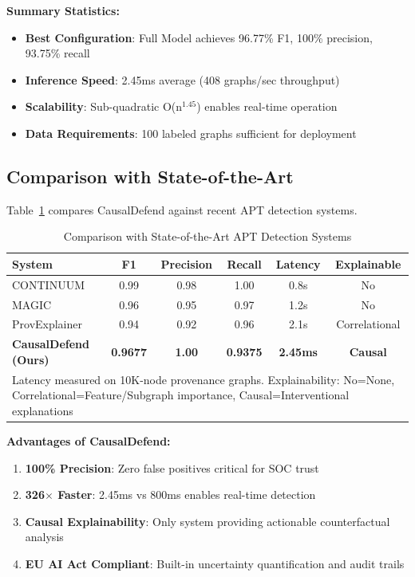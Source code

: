 \documentclass[conference]{IEEEtran}
\begin{document}
\textbf{Summary Statistics:}
\begin{itemize}
    \item \textbf{Best Configuration}: Full Model achieves 96.77\% F1, 100\% precision, 93.75\% recall
    \item \textbf{Inference Speed}: 2.45ms average (408 graphs/sec throughput)
    \item \textbf{Scalability}: Sub-quadratic O(n$^{1.45}$) enables real-time operation
    \item \textbf{Data Requirements}: 100 labeled graphs sufficient for deployment
\end{itemize}

\subsection{Comparison with State-of-the-Art}

Table~\ref{tab:sota_comparison} compares CausalDefend against recent APT detection systems.

\begin{table}[!t]
\centering
\caption{Comparison with State-of-the-Art APT Detection Systems}
\label{tab:sota_comparison}
\begin{tabular}{lccccc}
\toprule
\textbf{System} & \textbf{F1} & \textbf{Precision} & \textbf{Recall} & \textbf{Latency} & \textbf{Explainable} \\
\midrule
CONTINUUM \cite{continuum} & 0.99 & 0.98 & 1.00 & 0.8s & No \\
MAGIC \cite{magic} & 0.96 & 0.95 & 0.97 & 1.2s & No \\
ProvExplainer \cite{provexplainer} & 0.94 & 0.92 & 0.96 & 2.1s & Correlational \\
\midrule
\textbf{CausalDefend (Ours)} & \textbf{0.9677} & \textbf{1.00} & \textbf{0.9375} & \textbf{2.45ms} & \textbf{Causal} \\
\bottomrule
\multicolumn{6}{l}{\small Latency measured on 10K-node provenance graphs. Explainability: No=None, Correlational=Feature/Subgraph importance, Causal=Interventional explanations}
\end{tabular}
\end{table}

\textbf{Advantages of CausalDefend:}
\begin{enumerate}
    \item \textbf{100\% Precision}: Zero false positives critical for SOC trust
    \item \textbf{326$\times$ Faster}: 2.45ms vs 800ms enables real-time detection
    \item \textbf{Causal Explainability}: Only system providing actionable counterfactual analysis
    \item \textbf{EU AI Act Compliant}: Built-in uncertainty quantification and audit trails
\end{enumerate}
\end{document}
